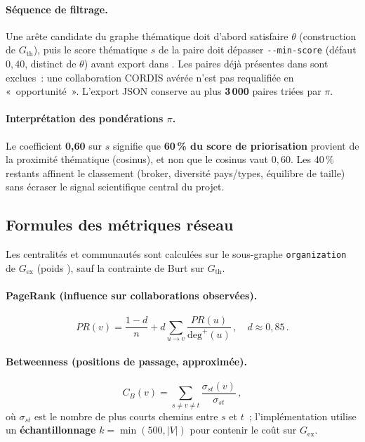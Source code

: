 \documentclass[12pt,a4paper,oneside]{article}
\begin{document}
\paragraph{Séquence de filtrage.}
Une arête candidate du graphe thématique doit d'abord satisfaire $\theta$ (construction de $G_{\mathrm{th}}$), puis le score thématique $s$ de la paire doit dépasser \texttt{-{}-min-score} (défaut $0{,}40$, distinct de $\theta$) avant export dans . Les paires déjà présentes dans  sont exclues~: une collaboration CORDIS avérée n'est pas requalifiée en «~opportunité~». L'export JSON conserve au plus \textbf{3\,000} paires triées par $\pi$.

\paragraph{Interprétation des pondérations $\pi$.}
Le coefficient \textbf{0,60} sur $s$ signifie que \textbf{60\,\% du score de priorisation} provient de la proximité thématique (cosinus), et non que le cosinus vaut $0{,}60$. Les 40\,\% restants affinent le classement (broker, diversité pays/types, équilibre de taille) sans écraser le signal scientifique central du projet.

\subsection{Formules des métriques réseau}\label{sec:formules}
Les centralités et communautés sont calculées sur le sous-graphe \texttt{organization} de $G_{\mathrm{ex}}$ (poids ), sauf la contrainte de Burt sur $G_{\mathrm{th}}$.

\paragraph{PageRank (influence sur collaborations observées).}
\begin{equation}
\label{eq:pagerank}
PR(v)=\frac{1-d}{n}+d\sum_{u\to v}\frac{PR(u)}{\mathrm{deg}^{+}(u)}\,,\quad d\approx 0{,}85\,.
\end{equation}

\paragraph{Betweenness (positions de passage, approximée).}
\begin{equation}
\label{eq:betweenness}
C_B(v)=\sum_{s\neq v\neq t}\frac{\sigma_{st}(v)}{\sigma_{st}}\,,
\end{equation}
où $\sigma_{st}$ est le nombre de plus courts chemins entre $s$ et $t$~; l'implémentation utilise un \textbf{échantillonnage} $k=\min(500,|V|)$ pour contenir le coût sur $G_{\mathrm{ex}}$.
\end{document}
